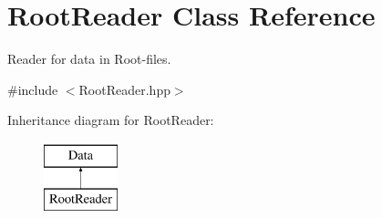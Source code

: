 \hypertarget{class_root_reader}{\section{Root\-Reader Class Reference}
\label{class_root_reader}
}


Reader for data in Root-\/files.  




{\ttfamily \#include $<$Root\-Reader.\-hpp$>$}

Inheritance diagram for Root\-Reader\-:\begin{figure}[H]
\begin{center}
\leavevmode
\includegraphics[height=2.000000cm]{class_root_reader}
\end{center}
\end{figure}
